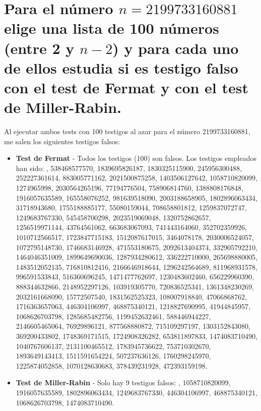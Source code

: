 \documentclass{article}
\begin{document}
	\section{Para el número $n = 2199733160881$ elige una lista de 100 números (entre 2 y $n-2$) y para cada uno de ellos estudia si es
testigo falso con el test de Fermat y con el test de Miller-Rabin.}	

	Al ejecutar ambos tests con 100 testigos al azar para el número 2199733160881, me salen los siguientes testigos falsos:
	
		\begin{itemize}
		\item \textbf{Test de Fermat} - Todos los testigos (100) son falsos. Los testigos empleados han sido: , 538468577570, 1839695826187, 1830325115900, 245956300488, 252227361614, 883005771162, 2021500875258, 1403506127642, 1058710820099, 1274965998, 2030564265196, 77194776504, 758906814760, 1388808176848, 1916057635589, 165558076252, 981639518090, 2003188658905, 1802896063434, 31718943680, 1755188885177, 55080159044, 708658801812, 1259837072747, 1249683767330, 545458700298, 2023519069048, 1320752862657, 1256519971144, 43764561062, 663683067093, 741443164060, 352702359926, 1010712566517, 1723847715183, 1512087617015, 3464078178, 2030006524057, 1072795148730, 1746683146928, 471553180675, 2092613404374, 332905792210, 1464046351009, 1899649690036, 1287934280612, 336222710000, 265698880005, 1483512052135, 716810812416, 2166646918644, 1296242564689, 811968931578, 996591533843, 516360696245, 1471477762697, 1230483602460, 656229960390, 888344632866, 2148952297126, 103919305770, 720836525341, 1361348230269, 2032161668090, 15772507540, 1831562525323, 108007918840, 47066868762, 1716363657063, 446304106997, 468875340121, 1218827690995, 41944845957, 1068626703798, 1285685482756, 1199452632461, 588446944227, 2146605465064, 76929896121, 877568880872, 715109297197, 1303152843080, 369200433802, 1748369171515, 1724908326282, 653811897833, 1474083710490, 1040767606137, 2131100465512, 1783945736622, 753710302670, 1893649143413, 1511591654224, 507237636126, 1760298245970, 1225874052858, 1070128630683, 378439231928, 472393159198.
		\item \textbf{Test de Miller-Rabin} - Solo hay 9 testigos falsos: , 1058710820099, 1916057635589, 1802896063434, 1249683767330, 446304106997, 468875340121, 1068626703798, 1474083710490.
	\end{itemize}
	
\end{document}
